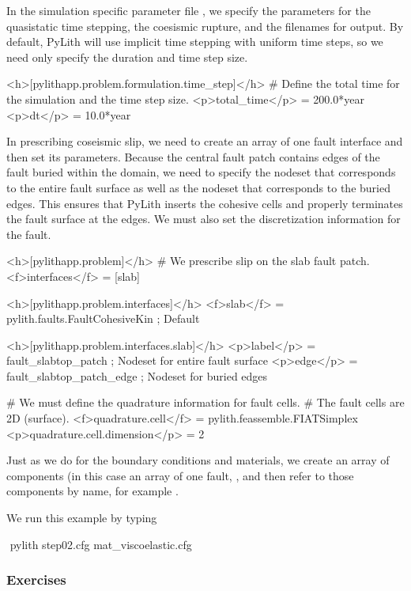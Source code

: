 In the simulation specific parameter file , we
specify the parameters for the quasistatic time stepping, the
coesismic rupture, and the filenames for output. By default, PyLith
will use implicit time stepping with uniform time steps, so we need
only specify the duration and time step size.
\begin{cfg}
<h>[pylithapp.problem.formulation.time_step]</h>
# Define the total time for the simulation and the time step size.
<p>total_time</p> = 200.0*year
<p>dt</p> = 10.0*year
\end{cfg}

In prescribing coseismic slip, we need to create an array of one fault
interface and then set its parameters. Because the central fault patch
contains edges of the fault buried within the domain, we need to
specify the nodeset that corresponds to the entire fault surface as
well as the nodeset that corresponds to the buried edges. This ensures
that PyLith inserts the cohesive cells and properly terminates the
fault surface at the edges. We must also set the discretization
information for the fault.
\begin{cfg}
<h>[pylithapp.problem]</h>
# We prescribe slip on the slab fault patch.
<f>interfaces</f> = [slab]

<h>[pylithapp.problem.interfaces]</h>
<f>slab</f> = pylith.faults.FaultCohesiveKin ; Default

<h>[pylithapp.problem.interfaces.slab]</h>
<p>label</p> = fault_slabtop_patch ; Nodeset for entire fault surface
<p>edge</p> = fault_slabtop_patch_edge ; Nodeset for buried edges

# We must define the quadrature information for fault cells.
# The fault cells are 2D (surface).
<f>quadrature.cell</f> = pylith.feassemble.FIATSimplex
<p>quadrature.cell.dimension</p> = 2
\end{cfg}
Just as we do for the boundary conditions and materials, we create an
array of components (in this case an array of one fault,
, and then refer to those components by name, for
example .


We run this example by typing
\begin{shell}
$$ pylith step02.cfg mat_viscoelastic.cfg
\end{shell}


\subsubsection{Exercises}

